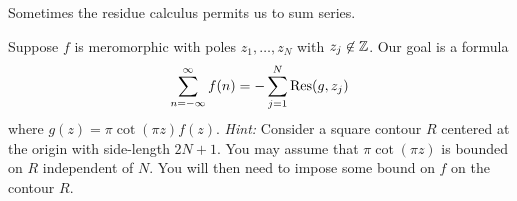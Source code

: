 \documentclass{homework}
\begin{document}
                                                                                                                                                                                \begin{problem}\label{summation-theorem}Sometimes the residue calculus
                                                                                                                                                                                  permits us to sum series.

                                                                                                                                                                                    Suppose $f$ is meromorphic with poles $z_1,\ldots,z_N$ with $z_j \not\in \mathbb{Z}$.  Our goal is a formula
                                                                                                                                                                                      \[
                                                                                                                                                                                          \sum_{n=-\infty}^{\infty} f(n) = - \sum_{j=1}^N \operatorname{Res}(g, z_j)
                                                                                                                                                                                            \]
                                                                                                                                                                                              where $g(z) = \pi \cot(\pi z) f(z)$.  \textit{Hint:} Consider a square contour $R$ centered at the origin with side-length $2N+1$.  You may assume that $\pi \cot(\pi z)$ is bounded on $R$ independent of $N$.  You will then need to impose some bound on $f$ on the contour $R$.
                                                                                                                                                                                              \end{problem}
\end{document}
